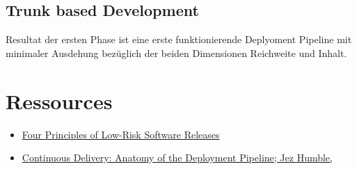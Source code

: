 \documentclass[a4paper]{article}
\begin{document}
\subsection*{Trunk based Development}
Resultat der ersten Phase ist eine erste funktionierende Deplyoment Pipeline
mit minimaler Ausdehung bezüglich der beiden Dimensionen Reichweite und Inhalt.

\section*{Ressources}
\begin{itemize}
  \item \href{http://www.informit.com/articles/article.aspx?p=1833567}{Four Principles of Low-Risk Software Releases}
  \item \href{http://www.informit.com/articles/article.aspx?p=1621865&seqNum=8}{Continuous Delivery: Anatomy of the Deployment Pipeline; Jez Humble, }
\end{itemize}

\cite{Lewin2015}
\cite{Humble2012a}
\cite{Humble2010}
\cite{Burnes2004}

\newpage


\end{document}

